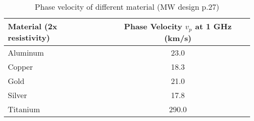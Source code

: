 \begin{table}
\caption{Phase velocity of different material (MW design p.27)}
\label{tab:phase-velocity}
\begin{tabular}{l|c}
\toprule
Material (2x resistivity) & \makecell{Phase Velocity\\$v_p$ at 1 GHz (km/s)} \\
\midrule
\hline
Aluminum & 23.0 \\
Copper & 18.3 \\
Gold & 21.0 \\
Silver & 17.8 \\
Titanium & 290.0 \\
\bottomrule
\end{tabular}
\end{table}
